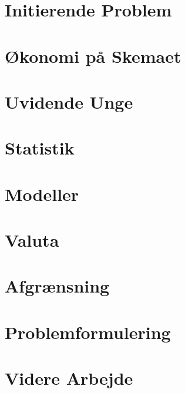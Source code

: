 


  \frame{\titlepage}
  
  \section{Initierende Problem}
  
  
  \section{Økonomi på Skemaet}
  
  
  \section{Uvidende Unge}
  
  
  \section{Statistik}
  
  
  \section{Modeller}
  
  
  \section{Valuta}
  
  
  \section{Afgrænsning}
  
  
  \section{Problemformulering}
  
  
  \section{Videre Arbejde}
  
  
